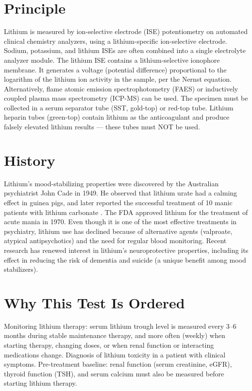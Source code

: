 \section*{Principle}
Lithium is measured by ion-selective electrode (ISE) potentiometry on automated clinical chemistry analyzers, using a lithium-specific ion-selective electrode. Sodium, potassium, and lithium ISEs are often combined into a single electrolyte analyzer module. The lithium ISE contains a lithium-selective ionophore membrane. It generates a voltage (potential difference) proportional to the logarithm of the lithium ion activity in the sample, per the Nernst equation. Alternatively, flame atomic emission spectrophotometry (FAES) or inductively coupled plasma mass spectrometry (ICP-MS) can be used. The specimen must be collected in a serum separator tube (SST, gold-top) or red-top tube. Lithium heparin tubes (green-top) contain lithium as the anticoagulant and produce falsely elevated lithium results --- these tubes must NOT be used.

\section*{History}
Lithium's mood-stabilizing properties were discovered by the Australian psychiatrist John Cade in 1949. He observed that lithium urate had a calming effect in guinea pigs, and later reported the successful treatment of 10 manic patients with lithium carbonate \cite{cade1949lithium}. The FDA approved lithium for the treatment of acute mania in 1970. Even though it is one of the most effective treatments in psychiatry, lithium use has declined because of alternative agents (valproate, atypical antipsychotics) and the need for regular blood monitoring. Recent research has renewed interest in lithium's neuroprotective properties, including its effect in reducing the risk of dementia and suicide (a unique benefit among mood stabilizers).

\section*{Why This Test Is Ordered}
Monitoring lithium therapy: serum lithium trough level is measured every 3--6 months during stable maintenance therapy, and more often (weekly) when starting therapy, changing doses, or when renal function or interacting medications change. Diagnosis of lithium toxicity in a patient with clinical symptoms. Pre-treatment baseline: renal function (serum creatinine, eGFR), thyroid function (TSH), and serum calcium must also be measured before starting lithium therapy.

